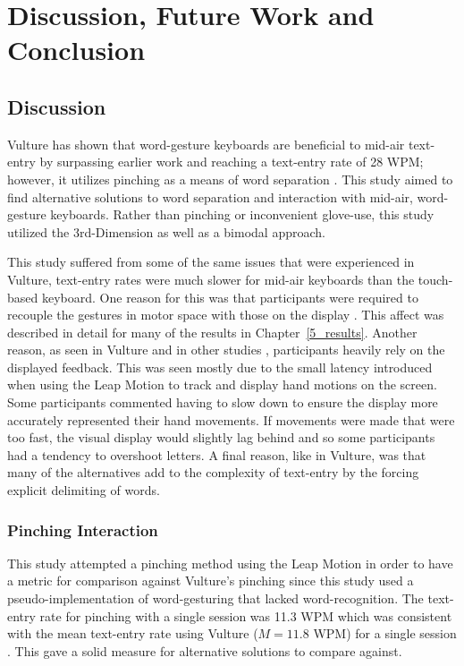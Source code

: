 \chapter{Discussion, Future Work and Conclusion}
\section{Discussion}
Vulture has shown that word-gesture keyboards are beneficial to mid-air text-entry by surpassing earlier work and reaching a text-entry rate of 28 WPM; however, it utilizes pinching as a means of word separation \cite{ref_vulture}. This study aimed to find alternative solutions to word separation and interaction with mid-air, word-gesture keyboards. Rather than pinching or inconvenient glove-use, this study utilized the 3rd-Dimension as well as a bimodal approach.

This study suffered from some of the same issues that were experienced in Vulture, text-entry rates were much slower for mid-air keyboards than the touch-based keyboard. One reason for this was that participants were required to recouple the gestures in motor space with those on the display \cite{ref_vulture}. This affect was described in detail for many of the results in Chapter~\ref{5_results}. Another reason, as seen in Vulture and in other studies \cite{ref_vulture,ref_visual_feedback_focus}, participants heavily rely on the displayed feedback. This was seen mostly due to the small latency introduced when using the Leap Motion to track and display hand motions on the screen. Some participants commented having to slow down to ensure the display more accurately represented their hand movements. If movements were made that were too fast, the visual display would slightly lag behind and so some participants had a tendency to overshoot letters. A final reason, like in Vulture, was that many of the alternatives add to the complexity of text-entry by the forcing explicit delimiting of words. 

\subsection{Pinching Interaction}
This study attempted a pinching method using the Leap Motion in order to have a metric for comparison against Vulture's pinching since this study used a pseudo-implementation of word-gesturing that lacked word-recognition. The text-entry rate for pinching with a single session was 11.3 WPM which was consistent with the mean text-entry rate using Vulture ($M = 11.8$ WPM) for a single session \cite{ref_vulture}. This gave a solid measure for alternative solutions to compare against.

